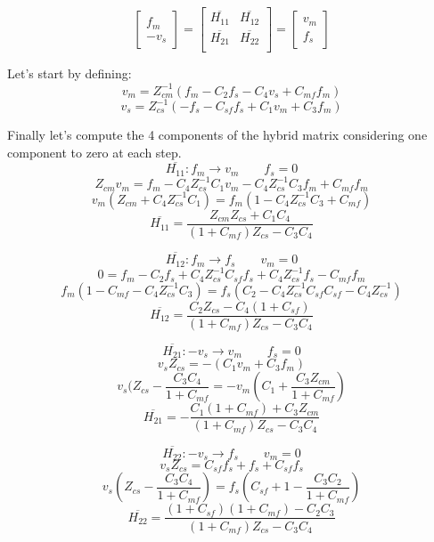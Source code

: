 \documentclass[a4paper,12pt]{article}
\begin{document}
\[
\begin{bmatrix}  f_m \\ -v_s \end{bmatrix} = \begin{bmatrix}
    \overline{H_{11}} & \overline{H_{12}} \\
    \overline{H_{21}} &  \overline{H_{22}} \\
\end{bmatrix} = \begin{bmatrix}  v_m \\ f_s \end{bmatrix}
\]

\noindent Let's start by defining:
\begin{equation}
    v_m = Z_{cm}^{-1}(f_m -C_2f_s-C_4v_s+C_{mf}f_m)
\end{equation}
\begin{equation}
    v_s = Z_{cs}^{-1}(-f_s -C_{sf}f_s+C_1v_m+C_3f_m)
\end{equation}

\noindent Finally let's compute the 4 components of the hybrid matrix considering one component to zero at each step.
\[
    \overline{H_{11}} : f_m \rightarrow v_m \qquad f_s = 0
    \]\[
    Z_{cm}v_m = f_m - C_4Z_{cs}^{-1}C_1v_m - C_4Z_{cs}^{-1}C_3f_m + C_{mf}f_m
\]\[
    v_m(Z_{cm}+C_4Z_{cs}^{-1}C_1) = f_m(1-C_4Z_{cs}^{-1}C_3 + C_{mf})
    \]\[
    \overline{H_{11}} = \frac{Z_{cm}Z_{cs}+C_1C_4}{(1+C_{mf})Z_{cs} - C_3C_4}
\]


\bigskip

\[
    \overline{H_{12}} : f_m \rightarrow f_s \qquad v_m = 0
    \]\[
    0 = f_m -C_2f_s +C_4Z_{cs}^{-1}C_{sf}f_s + C_4Z_{cs}^{-1}f_s - C_{mf}f_m
\]\[
    f_m(1-C_{mf}-C_4Z_{cs}^{-1}C_3) = f_s(C_2-C_4Z_{cs}^{-1}C_{sf}C_{sf}-C_4Z_{cs}^{-1})
    \]\[
    \overline{H_{12}} = \frac{C_2Z_{cs}-C_4(1+C_{sf})}{(1+C_{mf})Z_{cs} - C_3C_4}
\]

\bigskip

\[
    \overline{H_{21}} : -v_s \rightarrow v_m \qquad f_s = 0
    \]\[
    v_sZ_{cs} = -(C_1v_m + C_3f_m)
\]\[
    v_s(Z_{cs} - \frac{C_3C_4}{1+C_{mf}} = -v_m(C_1 + \frac{C_3Z_{cm}}{1+C_{mf}})
    \]\[
    \overline{H_{21}} = -\frac{C_1(1+C_{mf}) + C_3Z_{cm}}{(1+C_{mf})Z_{cs} - C_3C_4}
\]


\bigskip

\[
    \overline{H_{22}} : -v_s \rightarrow f_s \qquad v_m = 0
\]\[
    v_sZ_{cs} = C_{sf}f_s + f_s + C_{sf}f_s
\]\[
    v_s(Z_{cs}-\frac{C_3C_4}{1+C_{mf}}) = f_s(C_{sf} + 1 - \frac{C_3C_2}{1+C_{mf}})
\]\[
    \overline{H_{22}} = \frac{(1+C_{sf})(1+C_{mf})-C_2C_3}{(1+C_{mf})Z_{cs}-C_3C_4}
\]
\end{document}
